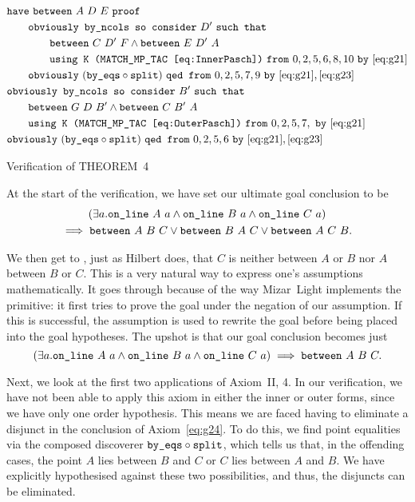 \begin{boxedfigure}
\begin{align*}
&\code{have}\ \between{A}{D}{E}\ \code{proof}\\
&\qquad\code{obviously by\_ncols so consider}\ D'\ \code{such that}\\
&\qquad\qquad\between{C}{D'}{F}\wedge\between{E}{D'}{A}\\
&\qquad\qquad\code{using K (MATCH\_MP\_TAC \eqref{eq:InnerPasch})}\ \code{from}\ 0,2,5,6,8,10\ \code{by}\ \eqref{eq:g21}\\
&\qquad\code{obviously}\ (\code{by\_eqs}\circ\code{split})\ \code{qed from}\ 0,2,5,7,9\ \code{by}\ \eqref{eq:g21},\eqref{eq:g23}\\
&\code{obviously by\_ncols so consider}\ B'\ \code{such that}\\
&\qquad\between{G}{D}{B'}\wedge\between{C}{B'}{A}\\
&\qquad\code{using K (MATCH\_MP\_TAC \eqref{eq:OuterPasch})}\ \code{from}\ 0,2,5,7,\ \code{by}\ \eqref{eq:g21}\\
&\code{obviously}\ (\code{by\_eqs}\circ\code{split})\ \code{qed from}\ 0,2,5,6\ \code{by}\ \eqref{eq:g21},\eqref{eq:g23}\\
\end{align*}
\caption{Verification of THEOREM~4}
\label{fig:FourVerification}
\end{boxedfigure}

At the start of the verification, we have set our ultimate goal conclusion to be
\begin{multline*}
(\exists a. \code{on\_line}\ A\ a\wedge\code{on\_line}\ B\ a\wedge\code{on\_line}\ C\ a) \\\implies\between{A}{B}{C}\vee\between{B}{A}{C}\vee\between{A}{C}{B}.
\end{multline*}

We then get to , just as Hilbert does, that $C$ is neither between $A$ or $B$ nor $A$ between $B$ or $C$. This is a very natural way to express one's assumptions mathematically. It goes through because of the way Mizar~Light implements the  primitive: it first tries to prove the goal under the negation of our assumption. If this is successful, the assumption is used to rewrite the goal before being placed into the goal hypotheses. The upshot is that our goal conclusion becomes just
\begin{displaymath}
(\exists a. \code{on\_line}\ A\ a\wedge\code{on\_line}\ B\ a\wedge\code{on\_line}\ C\ a) \implies\between{A}{B}{C}.
\end{displaymath}

Next, we look at the first two applications of Axiom~II, 4. In our verification, we have not been able to apply this axiom in either the inner or outer forms, since we have only one order hypothesis. This means we are faced having to eliminate a disjunct in the conclusion of Axiom~\ref{eq:g24}. To do this, we find point equalities via the composed discoverer $\texttt{by\_eqs}\circ\texttt{split}$, which tells us that, in the offending cases, the point $A$ lies between $B$ and $C$ or $C$ lies between $A$ and $B$. We have explicitly hypothesised against these two possibilities, and thus, the disjuncts can be eliminated.


